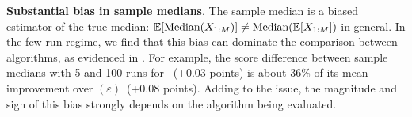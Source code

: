 \textbf{Substantial bias in sample medians}. The sample median is a biased estimator of the true median: $\mathbb{E}[\text{Median}({\bar X}_{1:M})] \neq  \text{Median}(\mathbb{E}[X_{1:M}])$ in general. In the few-run regime, we find that this bias can dominate the comparison between algorithms, as evidenced in . For example, the score difference between sample medians with 5 and 100 runs for \spr~(+0.03 points) is about 36\% of its mean improvement over \drq$(\varepsilon)$~(+0.08 points). Adding to the issue, the magnitude and sign of this bias strongly depends on the algorithm being evaluated.







